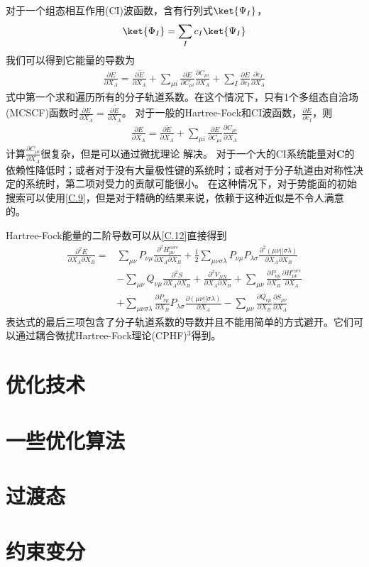 对于一个组态相互作用(CI)波函数，含有行列式$\ket{\Psi _I}$，
\begin{align}
	\nonumber
    \ket{\Phi  _I}=\sum_{I}c_I\ket{\Psi _I}
\end{align}
我们可以得到它能量的导数为
\begin{align}
	\label{C.16}
	\frac{\partial E}{\partial X_A}=\frac{\partial {\tilde{E} }}{\partial X_A}
	+\sum_{\mu i}\frac{\partial E}{\partial C_{\mu i}}\frac{\partial C_{\mu i}}{\partial X_A}
	+\sum_{I}\frac{\partial E}{\partial c_{I}}\frac{\partial c_{I}}{\partial X_A}
\end{align}
式中第一个求和遍历所有的分子轨道系数。在这个情况下，只有1个多组态自洽场(MCSCF)函数时$\frac{\partial E}{\partial X_A}=\frac{\partial {\tilde{E} }}{\partial X_A}$。
对于一般的Hartree-Fock和CI波函数，$\frac{\partial E}{\partial c_{I}}$，则
\begin{align}
	\label{C.17}
	\frac{\partial E}{\partial X_A}=\frac{\partial {\tilde{E} }}{\partial X_A}
	+\sum_{\mu i}\frac{\partial E}{\partial C_{\mu i}}\frac{\partial C_{\mu i}}{\partial X_A}
\end{align}
计算$\frac{\partial C_{\mu i}}{\partial X_A}$很复杂，但是可以通过微扰理论
解决。
对于一个大的CI系统能量对$\mathbf{C}$的依赖性降低时；或者对于没有大量极性键的系统时；或者对于分子轨道由对称性决定的系统时，第二项对受力的贡献可能很小。
在这种情况下，对于势能面的初始搜索可以使用\autoref{C.9}，但是对于精确的结果来说，依赖于这种近似是不令人满意的。

Hartree-Fock能量的二阶导数可以从\autoref{C.12}直接得到
\begin{align}
	\nonumber
	\frac{\partial^2 E}{\partial X_A\partial X_B}=&\sum_{ \mu \nu }P_{\nu \mu}\frac{\partial^2 H_{\mu \nu}^{core}}{\partial X_A\partial X_B}
		+\frac{1}{2}\sum_{\mu \nu \sigma \lambda }P_{ \nu \mu }P_{\lambda \sigma}\frac{\partial^2 (\mu \nu|| \sigma\lambda)}{\partial X_A\partial X_B}
		\\ \nonumber &
		-\sum_{\mu \nu }Q_{ \nu \mu}\frac{\partial^2 S}{\partial X_A\partial X_B}
		+\frac{\partial^2 V_{NN}}{\partial X_A\partial X_B}
		+\sum_{\mu \nu }\frac{\partial P_{ \nu\mu}}{\partial X_B}\frac{\partial H_{\mu \nu}^{core}}{\partial X_A}
		\\ \nonumber &
		+\sum_{\mu \nu \sigma \lambda }\frac{\partial P_{ \nu \mu }}{\partial X_B}P_{\lambda \sigma}\frac{\partial (\mu \nu|| \sigma\lambda)}{\partial X_A}
		-\sum_{\mu \nu }\frac{\partial Q_{ \nu\mu}}{\partial X_B}\frac{\partial S_{\mu \nu}}{\partial X_A}
	\end{align}
表达式的最后三项包含了分子轨道系数的导数并且不能用简单的方式避开。它们可以通过耦合微扰Hartree-Fock理论(CPHF)$^3$得到。
\section{优化技术}
\section{一些优化算法}
\section{过渡态}
\section{约束变分}
\newpage
\theendnotes
{}
